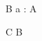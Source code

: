 \begin{zed}
	[A]
\end{zed}

\begin{schema}{B}
	a : \power A
\end{schema}

\begin{schema}{C}
	B
\end{schema}